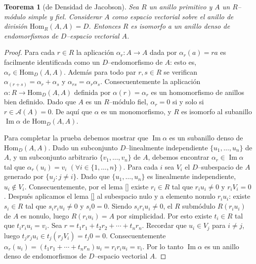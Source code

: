 \documentclass{report}
\newcommand{\Hom}{\text{Hom}}
\DeclareMathOperator{\image}{\text{Im}}
\newtheorem{theorem}{Teorema}
\begin{document}
  \begin{theorem}[de Densidad de Jacobson]
    Sea \(R\) un anillo primitivo y \(A\) un \(R\)--módulo simple y fiel.
    Considerar \(A\) como espacio vectorial sobre el anillo de división \(\Hom_R(A, A) = D\).
    Entonces \(R\) es isomorfo a un anillo denso de endomorfismos de \(D\)--espacio vectorial \(A\).
  \end{theorem}
  \begin{proof}
    Para cada \(r \in R\) la aplicación \(\alpha_r : A \rightarrow A\) dada por \(\alpha_r(a) = r a\) es facilmente identificada como un \(D\)--endomorfismo de \(A\): esto es, \(\alpha_r \in \Hom_D(A, A)\).
    Además para todo par \(r, s \in R\) se verifican \(\alpha_{(r + s)} = \alpha_r + \alpha_s\) y \(\alpha_{r s} = \alpha_r \alpha_s\).
    Consecuentemente la aplicación \(\alpha : R \rightarrow \Hom_D(A, A)\) definida por \(\alpha(r) = \alpha_r\) es un homomorfismo de anillos bien definido.
    Dado que \(A\) es un \(R\)--módulo fiel, \(\alpha_r = 0\) si y solo si \(r \in \mathcal{A}(A) = 0\).
    De aquí que \(\alpha\) es un monomorfismo, y \(R\) es isomorfo al subanillo \(\image \alpha\) de \(\Hom_D(A, A)\).

    Para completar la prueba debemos mostrar que \(\image \alpha\) es un subanillo denso de \(\Hom_D(A, A)\).
    Dado un subconjunto \(D\)--linealmente independiente \(\{u_1, \dots, u_n\}\) de \(A\), y un subconjunto arbitrario \(\{v_1, \dots, v_n\}\) de \(A\), debemos encontrar \(\alpha_r \in \image \alpha\) tal que \(\alpha_r(u_i) = v_i\) \((\forall i \in \{1, \dots, n\})\).
    Para cada \(i\) sea \(V_i\) el \(D\)--subespacio de \(A\) generado por \(\{u_j : j \neq i\}\).
    Dado que \(\{u_1, \dots, u_n\}\) es linealmente independiente, \(u_i \notin V_i\).
    Consecuentemente, por el lema \ref{} existe \(r_i \in R\) tal que \(r_i u_i \neq 0\) y \(r_i V_i = 0\).
    Después aplicamos el lema \ref{} al subespacio nulo y a elemento nonulo \(r_i u_i\):
    existe \(s_i \in R\) tal que \(s_i r_i u_i \neq 0\) y \(s_i 0 = 0\).
    Siendo \(s_i r_i u_i \neq 0\), el \(R\) submódulo \(R (r_i u_i)\) de \(A\) es nonulo, luego \(R(r_i u_i) = A\) por simplicidad.
    Por esto existe \(t_i \in R\) tal que \(t_i r_i u_i = v_i\).
    Sea \(r = t_1 r_1 + t_2 r_2 + \cdots + t_n r_n\).
    Recordar que \(u_i \in V_j\) para \(i \neq j\), luego \(t_j r_j u_i \in t_j (r_j V_i) = t_j 0 = 0\).
    Consecuentemente \(\alpha_r(u_i) = (t_1 r_1 + \cdots + t_n r_n) u_i = r_i r_i u_i = v_i\).
    Por lo tanto \(\image \alpha\) es un anillo denso de endomorfismos de \(D\)--espacio vectorial \(A\).
  \end{proof}
\end{document}
